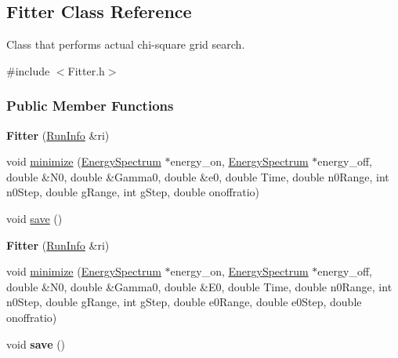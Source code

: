 \hypertarget{classFitter}{
\subsection{Fitter Class Reference}
\label{classFitter}
}


Class that performs actual chi-\/square grid search.  




{\ttfamily \#include $<$Fitter.h$>$}

\subsubsection*{Public Member Functions}
\begin{DoxyCompactItemize}
\item 
\hypertarget{classFitter_a23eb026bd4e127cefa0d83e2a6d4f002}{
{\bfseries Fitter} (\hyperlink{classRunInfo}{RunInfo} \&ri)}
\label{classFitter_a23eb026bd4e127cefa0d83e2a6d4f002}

\item 
void \hyperlink{classFitter_a88492ebdbfa181370dc05a584ec9a040}{minimize} (\hyperlink{classEnergySpectrum}{EnergySpectrum} $\ast$energy\_\-on, \hyperlink{classEnergySpectrum}{EnergySpectrum} $\ast$energy\_\-off, double \&N0, double \&Gamma0, double \&e0, double Time, double n0Range, int n0Step, double gRange, int gStep, double onoffratio)
\item 
\hypertarget{classFitter_aeb18a74a610dd87bc662c18ca6c28cc8}{
void \hyperlink{classFitter_aeb18a74a610dd87bc662c18ca6c28cc8}{save} ()}
\label{classFitter_aeb18a74a610dd87bc662c18ca6c28cc8}

\item 
\hypertarget{classFitter_a23eb026bd4e127cefa0d83e2a6d4f002}{
{\bfseries Fitter} (\hyperlink{classRunInfo}{RunInfo} \&ri)}
\label{classFitter_a23eb026bd4e127cefa0d83e2a6d4f002}

\item 
void \hyperlink{classFitter_a6f93aeb7b89a67f368cfa03abdce3e5a}{minimize} (\hyperlink{classEnergySpectrum}{EnergySpectrum} $\ast$energy\_\-on, \hyperlink{classEnergySpectrum}{EnergySpectrum} $\ast$energy\_\-off, double \&N0, double \&Gamma0, double \&E0, double Time, double n0Range, int n0Step, double gRange, int gStep, double e0Range, double e0Step, double onoffratio)
\item 
\hypertarget{classFitter_aeb18a74a610dd87bc662c18ca6c28cc8}{
void {\bfseries save} ()}
\label{classFitter_aeb18a74a610dd87bc662c18ca6c28cc8}

\end{DoxyCompactItemize}


